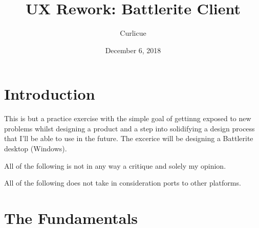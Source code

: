 \documentclass[a4paper,12pt]{article}
\title{UX Rework: Battlerite Client}
\author{Curlicue}
\date{December 6, 2018}
\begin{document}
\pagecolor{black!3}
\setlength{\parindent}{0in}

\maketitle

\tableofcontents

\newpage
\section{Introduction}
 
This is but a practice exercise with the simple goal of gettinng exposed to new problems whilst designing a product and a step into solidifying a design process that I'll be able to use in the future. The excerice will be designing a Battlerite desktop (Windows).
\begin{notes}
    \item All of the following is not in any way a critique and solely my opinion.
    \item All of the following does not take in consideration ports to other platforms.
\end{notes}

\newpage
\section{The Fundamentals}
\label{the_fundamentals}
\end{document}
